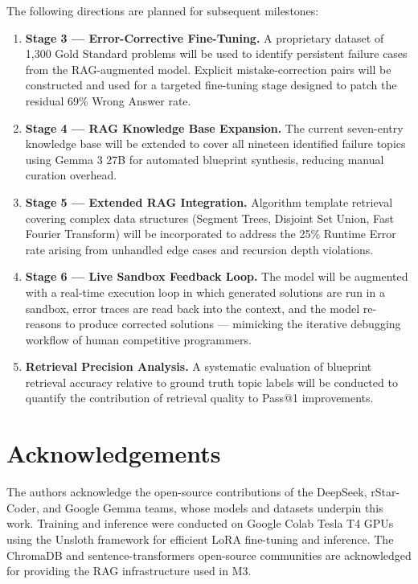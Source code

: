 \documentclass[12pt,a4paper]{article}
\begin{document}
The following directions are planned for subsequent milestones:

\begin{enumerate}
    \item \textbf{Stage 3 --- Error-Corrective Fine-Tuning.} A proprietary dataset of 1,300 Gold Standard problems will be used to identify persistent failure cases from the RAG-augmented model. Explicit mistake-correction pairs will be constructed and used for a targeted fine-tuning stage designed to patch the residual 69\% Wrong Answer rate.

    \item \textbf{Stage 4 --- RAG Knowledge Base Expansion.} The current seven-entry knowledge base will be extended to cover all nineteen identified failure topics using Gemma 3 27B for automated blueprint synthesis, reducing manual curation overhead.

    \item \textbf{Stage 5 --- Extended RAG Integration.} Algorithm template retrieval covering complex data structures (Segment Trees, Disjoint Set Union, Fast Fourier Transform) will be incorporated to address the 25\% Runtime Error rate arising from unhandled edge cases and recursion depth violations.

    \item \textbf{Stage 6 --- Live Sandbox Feedback Loop.} The model will be augmented with a real-time execution loop in which generated solutions are run in a sandbox, error traces are read back into the context, and the model re-reasons to produce corrected solutions --- mimicking the iterative debugging workflow of human competitive programmers.

    \item \textbf{Retrieval Precision Analysis.} A systematic evaluation of blueprint retrieval accuracy relative to ground truth topic labels will be conducted to quantify the contribution of retrieval quality to Pass@1 improvements.
\end{enumerate}

\section*{Acknowledgements}

The authors acknowledge the open-source contributions of the DeepSeek, rStar-Coder, and Google Gemma teams, whose models and datasets underpin this work. Training and inference were conducted on Google Colab Tesla T4 GPUs using the Unsloth framework for efficient LoRA fine-tuning and inference. The ChromaDB and sentence-transformers open-source communities are acknowledged for providing the RAG infrastructure used in M3.
\end{document}
